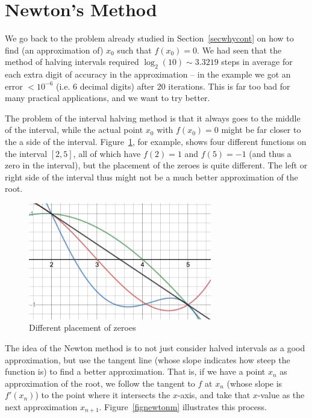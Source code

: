 \section{Newton's Method}
\label{secnewton}

We go back to the problem already studied in Section~\ref{secwhycont} on how
to find (an approximation of) $x_0$ such that $f(x_0)=0$.
We had seen that the method of halving intervals required $\log_2(10)\sim
3.3219$ steps in average for each extra digit of accuracy in the
approximation -- in the example we got an error $<10^{-6}$ (i.e. $6$ decimal
digits) after 20 iterations.
This is far too bad for many practical applications, and we want to try
better. 

The problem of the interval halving method is that it always goes to the
middle of the interval, while the actual point $x_0$ with $f(x_0)=0$ might
be far closer to the a side of the interval. Figure~\ref{fignewton4}, for
example, shows four different functions on the interval $[2,5]$, all of
which have $f(2)=1$ and $f(5)=-1$ (and thus a zero in the interval), but the
placement of the zeroes is quite different. The left or right side of the
interval thus might not be a much better approximation of the root.
\begin{figure}
\begin{center}
\includegraphics[width=8cm]{pic/newton4.png}
\end{center}
\caption{Different placement of zeroes}
\label{fignewton4}
\end{figure}

The idea of the Newton method is to not just consider halved intervals
as a good approximation, but use the tangent line (whose slope
indicates how steep the function is) to find a better
approximation. That
is, if we have a point $x_n$ as approximation of the root, we follow the
tangent to $f$ at $x_n$ (whose slope is $f'(x_n)$) to the point where it
intersects the $x$-axis, and take that $x$-value as the next approximation
$x_{n+1}$. Figure~\ref{fignewtonm} illustrates this process.

